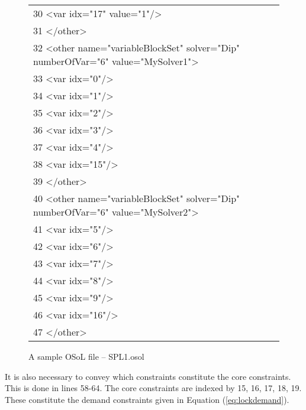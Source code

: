\documentclass[11pt]{article}
\begin{document}
{\begin{figure}[hp]
{{{\begin{tabular}{@{}l@{}}
30              <var idx="17" value="1"/>\\
31           </other>\\
32           <other name="variableBlockSet" solver="Dip" numberOfVar="6" value="MySolver1">\\
33              <var idx="0"/>\\
34              <var idx="1"/>\\
35              <var idx="2"/>\\
36              <var idx="3"/>\\
37              <var idx="4"/>\\
38              <var idx="15"/>\\
39           </other>\\
40           <other name="variableBlockSet" solver="Dip" numberOfVar="6" value="MySolver2">\\
41              <var idx="5"/>\\
42              <var idx="6"/>\\
43              <var idx="7"/>\\
44              <var idx="8"/>\\
45              <var idx="9"/>\\
46              <var idx="16"/>\\
47           </other>\\
\end{tabular} }}} \medskip
\caption{A sample OSoL file -- SPL1.osol}\label{figure:parinc-osil}
\end{figure}
} %


It is also necessary to convey which constraints constitute the core
constraints. This is done in lines 58-64. The core constraints are indexed by
15, 16, 17, 18, 19. These constitute the demand constraints given in Equation
(\ref{eq:lockdemand}). 
\end{document}
